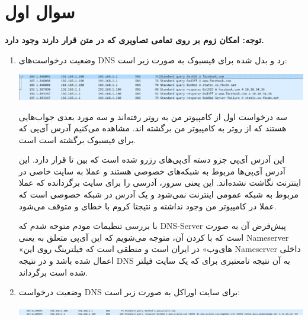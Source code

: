 \documentclass[12pt]{article}
\begin{document}
	\KashidaOff
	
	\section{سوال اول}
	
	\textbf{توجه: امکان زوم بر روی تمامی تصاویری که در متن قرار دارند وجود دارد.}
	
	\begin{enumerate}
		
		\item
		
		وضعیت درخواست‌های DNS رد و بدل شده برای فیسبوک به صورت زیر است:
		
		\begin{center}
			\includegraphics[width = 1.0 \textwidth]{images/1.png}
		\end{center}

سه درخواست اول از کامپیوتر من به روتر رفته‌اند و سه مورد بعدی جواب‌هایی هستند که از روتر به کامپیوتر من برگشته اند. مشاهده می‌کنیم آدرس آی‌پی که برای فیسبوک برگشته است
است.

این آدرس آی‌پی جزو دسته آی‌پی‌های رزرو شده است که بین
تا
قرار دارد. این آدرس آی‌پی‌ها مربوط به شبکه‌های خصوصی هستند و عملا به سایت خاصی در اینترنت نگاشت نشده‌اند. این یعنی  سرور، آدرسی را برای سایت  برگردانده که عملا مربوط به شبکه عمومی اینترنت نمی‌شود و یک آدرس در شبکه خصوصی است که عملا در کامپیوتر من وجود  نداشته و نتیجتا کروم با خطای
و
متوقف می‌شود.
	
	با بررسی تنظیمات مودم متوجه شدم که DNS-Server پیش‌فرض آن به صورت  است که با  کردن آن، متوجه می‌شویم که این آی‌پی متعلق به  یعنی Nameserver «های‌وب» در ایران است و منطقی است که فیلترینگ روی این Nameserver داخلی اعمال شده باشد و در نتیجه DNS به آن نتیجه نامعتبری برای  که یک سایت فیلتر شده است برگرداند.
	
	
	\item
	
	وضعیت درخواست DNS برای سایت اوراکل به صورت زیر است:
	
		\begin{center}
		\includegraphics[width = 1.0 \textwidth]{images/2.png}
	\end{center}
	

\end{enumerate}
\end{document}
